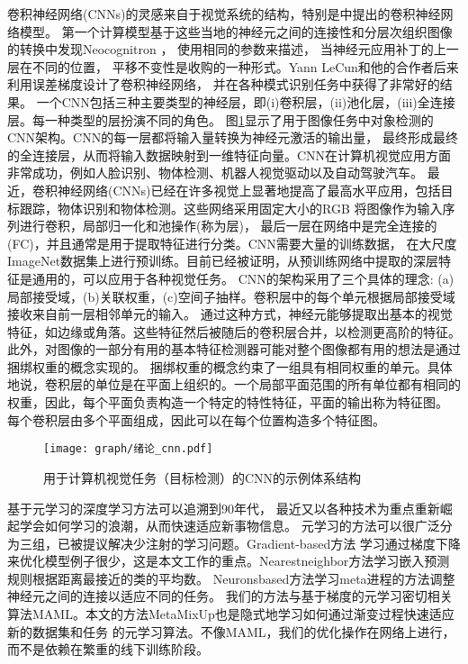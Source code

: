 \documentclass[promaster]{thesis-uestc}
\begin{document}
卷积神经网络(CNNs)的灵感来自于视觉系统的结构，特别是\cite{hubel1962receptive}中提出的卷积神经网络模型。
第一个计算模型基于这些当地的神经元之间的连接性和分层次组织图像的转换中发现Neocognitron\cite{fukushima1982neocognitron}
， 使用相同的参数来描述， 当神经元应用补丁的上一层在不同的位置， 平移不变性是收购的一种形式。Yann LeCun和他的合作者后来利用误差梯度设计了卷积神经网络，
并在各种模式识别任务中获得了非常好的结果\cite{lecun1998gradient}\cite{tygert2016mathematical}\cite{lecun1989backpropagation}。
一个CNN包括三种主要类型的神经层，即(i)卷积层，(ii)池化层，(iii)全连接层。每一种类型的层扮演不同的角色。
图\ref{绪论_cnn}显示了用于图像任务中对象检测的CNN架构。CNN的每一层都将输入量转换为神经元激活的输出量，
最终形成最终的全连接层，从而将输入数据映射到一维特征向量。CNN在计算机视觉应用方面非常成功，例如人脸识别、物体检测、机器人视觉驱动以及自动驾驶汽车。
最近，卷积神经网络(CNNs)已经在许多视觉上显著地提高了最高水平应用，包括目标跟踪\cite{siamfc++}\cite{siamrpn++}，物体识别\cite{imagenet}和物体检测\cite{detect_libra_rcnn}。这些网络采用固定大小的RGB
将图像作为输入序列进行卷积，局部归一化和池操作(称为层)， 最后一层在网络中是完全连接的(FC)，并且通常是用于提取特征进行分类。CNN需要大量的训练数据，
在大尺度ImageNet数据集上进行预训练。目前已经被证明，从预训练网络中提取的深层特征是通用的，可以应用于各种视觉任务。
CNN的架构采用了三个具体的理念: (a)局部接受域，(b)关联权重，(c)空间子抽样。卷积层中的每个单元根据局部接受域接收来自前一层相邻单元的输入。
通过这种方式，神经元能够提取出基本的视觉特征，如边缘或角落。这些特征然后被随后的卷积层合并，以检测更高阶的特征。此外，对图像的一部分有用的基本特征检测器可能对整个图像都有用的想法是通过捆绑权重的概念实现的。
捆绑权重的概念约束了一组具有相同权重的单元。具体地说，卷积层的单位是在平面上组织的。一个局部平面范围的所有单位都有相同的权重，因此，每个平面负责构造一个特定的特性特征，平面的输出称为特征图。
每个卷积层由多个平面组成，因此可以在每个位置构造多个特征图。

\begin{figure}[htp!]
	\centering  
	\texttt{[image: graph/绪论\_cnn.pdf]}
	\caption{用于计算机视觉任务（目标检测）的CNN的示例体系结构}
	\label{绪论_cnn}
\end{figure}

基于元学习的深度学习方法可以追溯到90年代\cite{thrun1998learning}\cite{bengio1990learning}， 
最近又以各种技术为重点重新崛起学会如何学习的浪潮，从而快速适应新事物信息\cite{ravi2016}。
元学习的方法可以很广泛分为三组，已被提议解决少注射的学习问题。Gradient-based方法\cite{finn2017model}\cite{ravi2016}
学习通过梯度下降来优化模型例子很少，这是本文工作的重点。Nearestneighbor方法\cite{snell2017prototypical}学习嵌入预测规则根据距离最接近的类的平均数。
Neuronsbased方法\cite{mishra2017simple}\cite{munkhdalai2018rapid}学习meta进程的方法调整神经元之间的连接以适应不同的任务。
我们的方法与基于梯度的元学习密切相关算法MAML\cite{finn2017model}。本文的方法MetaMixUp也是隐式地学习如何通过渐变过程快速适应新的数据集和任务
的元学习算法。不像MAML，我们的优化操作在网络上进行，而不是依赖在繁重的线下训练阶段。
\end{document}

